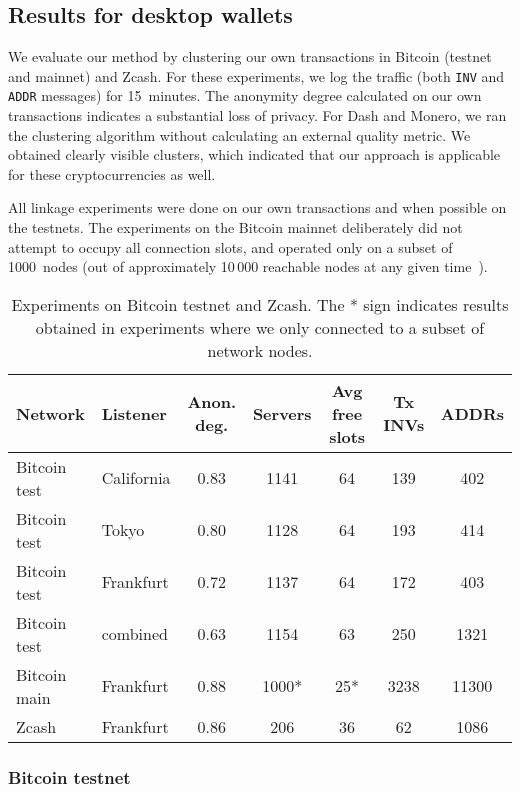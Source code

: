 \subsection{Results for desktop wallets}

We evaluate our method by clustering our own transactions in Bitcoin (testnet and mainnet) and Zcash.
For these experiments, we log the traffic (both \texttt{INV} and \texttt{ADDR} messages) for 15~minutes.
The anonymity degree calculated on our own transactions indicates a substantial loss of privacy.
For Dash and Monero, we ran the clustering algorithm without calculating an external quality metric.
We obtained clearly visible clusters, which indicated that our approach is applicable for these cryptocurrencies as well.

All linkage experiments were done on our own transactions and when possible on the testnets.
The experiments on the Bitcoin mainnet deliberately did not attempt to occupy all connection slots, and operated only on a subset of 1000~nodes (out of approximately 10\,000 reachable nodes at any given time~\cite{Bitnodes}).

\begin{table*}[!t]
	\normalsize
	\caption{Experiments on Bitcoin testnet and Zcash. The * sign indicates results obtained in experiments where we only connected to a subset of network nodes.}
	\centering
	\begin{tabular}{ | l | l | c | c | c | c | c | }
		\hline
		Network & Listener & Anon. deg. & Servers & Avg free slots & Tx INVs & ADDRs \\
		\hline
		Bitcoin test & California & 0.83 & 1141 & 64 & 139 & 402 \\
		Bitcoin test & Tokyo & 0.80 & 1128 & 64 & 193 & 414 \\
		Bitcoin test & Frankfurt & 0.72 & 1137 & 64 & 172 & 403 \\
		Bitcoin test & combined & 0.63 & 1154 & 63 & 250 & 1321 \\
		Bitcoin main & Frankfurt & 0.88 & 1000* & 25* & 3238 & 11300 \\
		Zcash & Frankfurt & 0.86 & 206 & 36 & 62 & 1086 \\
		\hline
	\end{tabular}
	\label{tab:results}
\end{table*}

\subsubsection{Bitcoin testnet}


